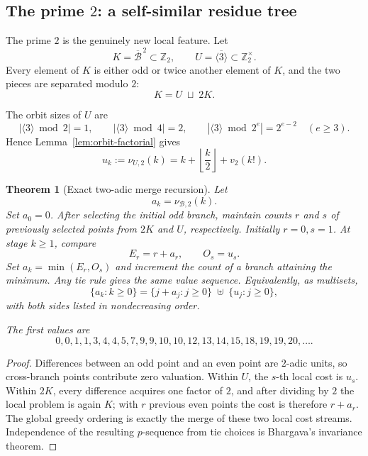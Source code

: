 \documentclass[11pt,oneside]{article}
\newtheorem{theorem}{Theorem}[section]
\theoremstyle{definition}
\theoremstyle{remark}
\newcommand{\Z}{\mathbb Z}
\newcommand{\B}{\mathcal B}
\newcommand{\floor}[1]{\left\lfloor #1\right\rfloor}
\begin{document}
\subsection{The prime \(2\): a self-similar residue tree}

The prime \(2\) is the genuinely new local feature.  Let
\[
  K=\overline{\B}^{\,2}\subset\Z_2,
  \qquad
  U=\overline{\langle3\rangle}\subset\Z_2^\times.
\]
Every element of \(K\) is either odd or twice another element of \(K\), and the two pieces are
separated modulo \(2\):
\begin{equation}
  K=U\;\sqcup\;2K.
  \label{eq:K-decomposition}
\end{equation}

The orbit sizes of \(U\) are
\[
 |\langle3\rangle\bmod2|=1,\qquad
 |\langle3\rangle\bmod4|=2,\qquad
 |\langle3\rangle\bmod2^e|=2^{e-2}\quad(e\ge3).
\]
Hence Lemma~\ref{lem:orbit-factorial} gives
\begin{equation}
  u_k:=\nu_{U,2}(k)
  =k+\floor{\frac{k}{2}}+v_2(k!).
  \label{eq:u-k}
\end{equation}

\begin{theorem}[Exact two-adic merge recursion]
\label{thm:p2-recursion}
Let
\[
 a_k=\nu_{\B,2}(k).
\]
Set \(a_0=0\).  After selecting the initial odd branch, maintain counts \(r\) and \(s\) of
previously selected points from \(2K\) and \(U\), respectively.  Initially \(r=0,s=1\).
At stage \(k\ge1\), compare
\begin{equation}
  E_r=r+a_r,\qquad O_s=u_s.
  \label{eq:branch-costs}
\end{equation}
Set \(a_k=\min(E_r,O_s)\) and increment the count of a branch attaining the minimum.  Any
tie rule gives the same value sequence.  Equivalently, as multisets,
\begin{equation}
 \{a_k:k\ge0\}
 =
 \{j+a_j:j\ge0\}\;\uplus\;\{u_j:j\ge0\},
 \label{eq:multiset-fixedpoint}
\end{equation}
with both sides listed in nondecreasing order.

The first values are
\begin{equation}
 0,0,1,1,3,4,4,5,7,9,9,10,10,12,13,14,15,18,19,19,20,\ldots.
 \label{eq:a-first}
\end{equation}
\end{theorem}

\begin{proof}
Differences between an odd point and an even point are \(2\)-adic units, so cross-branch
points contribute zero valuation.  Within \(U\), the \(s\)-th local cost is \(u_s\).  Within
\(2K\), every difference acquires one factor of \(2\), and after dividing by \(2\) the local
problem is again \(K\); with \(r\) previous even points the cost is therefore \(r+a_r\).
The global greedy ordering is exactly the merge of these two local cost streams.  Independence
of the resulting \(p\)-sequence from tie choices is Bhargava's invariance theorem.
\end{proof}
\end{document}
